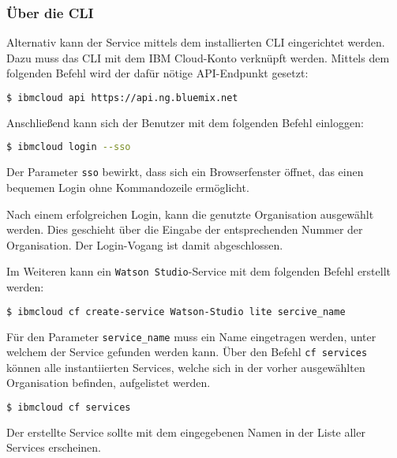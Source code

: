 \subsubsection*{Über die CLI}
Alternativ kann der Service mittels dem installierten CLI eingerichtet werden. Dazu muss das CLI mit dem IBM
Cloud-Konto verknüpft werden. Mittels dem folgenden Befehl wird der dafür nötige API-Endpunkt gesetzt:

\begin{lstlisting}[language=bash, caption=Setzen des API Targets, label=Setzen des API Targets]
    $ ibmcloud api https://api.ng.bluemix.net
\end{lstlisting}

Anschließend kann sich der Benutzer mit dem folgenden Befehl einloggen:

\begin{lstlisting}[language=bash, caption=Login über CLI und Single Sign-on, label=Login über CLI und SSO]
    $ ibmcloud login --sso
\end{lstlisting}

Der Parameter \texttt{sso} bewirkt, dass sich ein Browserfenster öffnet, das einen bequemen Login ohne Kommandozeile
ermöglicht.

Nach einem erfolgreichen Login, kann die genutzte Organisation ausgewählt werden. Dies geschieht über die Eingabe der
entsprechenden Nummer der Organisation. Der Login-Vogang ist damit abgeschlossen.

Im Weiteren kann ein \texttt{Watson Studio}-Service mit dem folgenden Befehl erstellt werden:

\begin{lstlisting}[language=bash, caption=Instanziierung des Watson Studio Services, label=Instanziierung des Watson Studio Services]
    $ ibmcloud cf create-service Watson-Studio lite sercive_name
\end{lstlisting}

Für den Parameter \texttt{service\_name} muss ein Name eingetragen werden, unter welchem der Service gefunden werden kann.
Über den Befehl \texttt{cf services} können alle instantiierten Services, welche sich in der vorher ausgewählten
Organisation befinden, aufgelistet werden.

\begin{lstlisting}[language=bash, caption=Auflisten aller Services, label=Auflisten aller Services]
    $ ibmcloud cf services
\end{lstlisting}

Der erstellte Service sollte mit dem eingegebenen Namen in der Liste aller Services erscheinen.

